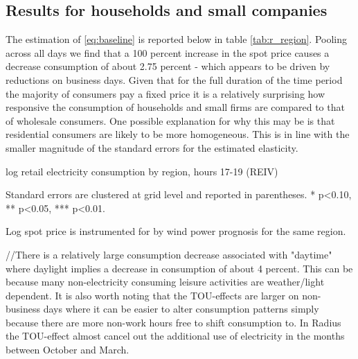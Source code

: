 \subsection{Results for households and small companies}
The estimation of \eqref{eq:baseline} is reported below in table \ref{tab:r_region}. Pooling across all days we find that a 100 percent increase in the spot price causes a decrease consumption of about 2.75 percent - which appears to be driven by reductions on business days. Given that for the full duration of the time period the majority of consumers pay a fixed price it is a relatively surprising how responsive the consumption of households and small firms are compared to that of wholesale consumers. One possible explanation for why this may be is that residential consumers are likely to be more homogeneous. This is in line with the smaller magnitude of the standard errors for the estimated elasticity.
\label{subsec:r_households}
\begin{table}[H]
\begin{threeparttable}
  \centering
  \caption{log retail electricity consumption by region, hours 17-19 (REIV)}
  \label{tab:r_region}
  \footnotesize
    
    \begin{tablenotes}
    \item Standard errors are clustered at grid level and reported in parentheses. * p<0.10, ** p<0.05, *** p<0.01.
    \item Log spot price is instrumented for by wind power prognosis for the same region.
  \end{tablenotes}
\end{threeparttable}
\end{table}
//There is a relatively large consumption decrease associated with "daytime" where daylight implies a decrease in consumption of about 4 percent. This can be because many non-electricity consuming leisure activities are weather/light dependent. It is also worth noting that the TOU-effects are larger on non-business days where it can be easier to alter consumption patterns simply because there are more non-work hours free to shift consumption to. In Radius the TOU-effect almost cancel out the additional use of electricity in the months between October and March.  

